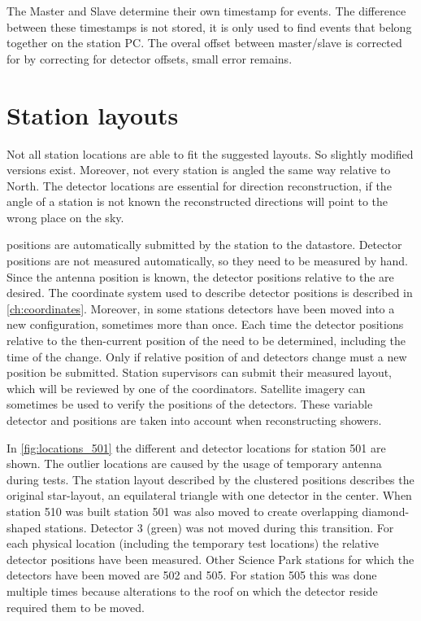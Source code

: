 The Master and Slave determine their own timestamp for events. The difference between these timestamps is not stored, it is only used to find events that belong together on the station PC. The overal offset between master/slave is corrected for by correcting for detector offsets, small error remains.


\section{Station layouts}

Not all station locations are able to fit the suggested layouts. So slightly modified versions exist. Moreover, not every station is angled the same way relative to North. The detector locations are essential for direction reconstruction, if the angle of a station is not known the reconstructed directions will point to the wrong place on the sky.

\gps positions are automatically submitted by the station to the datastore. Detector positions are not measured automatically, so they need to be measured by hand. Since the \gps antenna position is known, the detector positions relative to the \gps are desired. The coordinate system used to describe detector positions is described in \cref{ch:coordinates}. Moreover, in some stations detectors have been moved into a new configuration, sometimes more than once. Each time the detector positions relative to the then-current position of the \gps need to be determined, including the time of the change. Only if relative position of \gps and detectors change must a new position be submitted. Station supervisors can submit their measured layout, which will be reviewed by one of the \hisparc coordinators. Satellite imagery can sometimes be used to verify the positions of the detectors. These variable detector and \gps positions are taken into account when reconstructing showers.

In \cref{fig:locations_501} the different \gps and detector locations for station 501 are shown. The outlier \gps locations are caused by the usage of temporary \gps antenna during tests. The station layout described by the clustered positions describes the original star-layout, an equilateral triangle with one detector in the center. When station 510 was built station 501 was also moved to create overlapping diamond-shaped stations. Detector 3 (green) was not moved during this transition. For each physical \gps location (including the temporary test locations) the relative detector positions have been measured. Other Science Park stations for which the detectors have been moved are 502 and 505. For station 505 this was done multiple times because alterations to the roof on which the detector reside required them to be moved.

